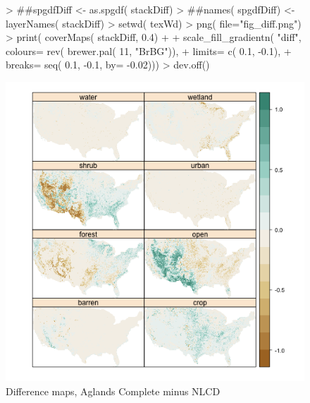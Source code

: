 \begin{figure} 
\begin{center} 

\begin{Schunk}
\begin{Sinput}
> ##spgdfDiff <- as.spgdf( stackDiff)
> ##names( spgdfDiff) <- layerNames( stackDiff)
> setwd( texWd)
> png( file="fig_diff.png")
> print( coverMaps( stackDiff, 0.4) + 
+   scale_fill_gradientn( "diff", colours= rev( brewer.pal( 11, "BrBG")), 
+                          limits= c( 0.1, -0.1),
+                          breaks= seq( 0.1, -0.1, by= -0.02)))
> dev.off()
\end{Sinput}
\end{Schunk}

\includegraphics{fig_diff}
\end{center} 
\caption{Difference maps, Aglands Complete minus NLCD} 
\label{fig:diff} 
\end{figure} 

